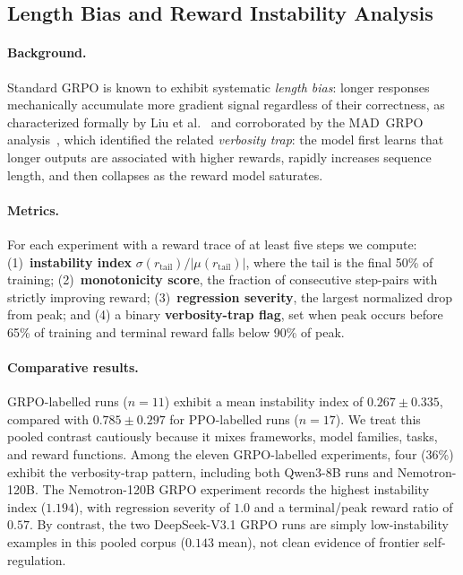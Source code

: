 \documentclass{article}
\begin{document}
\subsection{Length Bias and Reward Instability Analysis}
\label{sec:length_bias}

\paragraph{Background.}
Standard GRPO is known to exhibit systematic \emph{length bias}: longer responses
mechanically accumulate more gradient signal regardless of their correctness,
as characterized formally by Liu et al.~\cite{liu2025drgrpo} and corroborated
by the MAD~GRPO analysis~\cite{wang2025madgrpo}, which identified the related
\emph{verbosity trap}: the model first learns that longer outputs are associated
with higher rewards, rapidly increases sequence length, and then collapses as
the reward model saturates.

\paragraph{Metrics.}
For each experiment with a reward trace of at least five steps we compute:
(1)~\textbf{instability index} $\sigma(r_{\text{tail}}) / |\mu(r_{\text{tail}})|$,
where the tail is the final 50\% of training;
(2)~\textbf{monotonicity score}, the fraction of consecutive step-pairs with
strictly improving reward;
(3)~\textbf{regression severity}, the largest normalized drop from peak;
and (4) a binary \textbf{verbosity-trap flag}, set when peak occurs before 65\%
of training and terminal reward falls below 90\% of peak.

\paragraph{Comparative results.}
GRPO-labelled runs ($n = 11$) exhibit a mean instability index of
$0.267 \pm 0.335$, compared with $0.785 \pm 0.297$ for PPO-labelled runs
($n = 17$). We treat this pooled contrast cautiously because it mixes
frameworks, model families, tasks, and reward functions. Among the eleven
GRPO-labelled experiments, four (36\%) exhibit the verbosity-trap pattern,
including both Qwen3-8B runs and Nemotron-120B. The Nemotron-120B GRPO
experiment records the highest instability index ($1.194$), with regression
severity of $1.0$ and a terminal/peak reward ratio of $0.57$. By contrast,
the two DeepSeek-V3.1 GRPO runs are simply low-instability examples in this
pooled corpus ($0.143$ mean), not clean evidence of frontier self-regulation.
\end{document}
